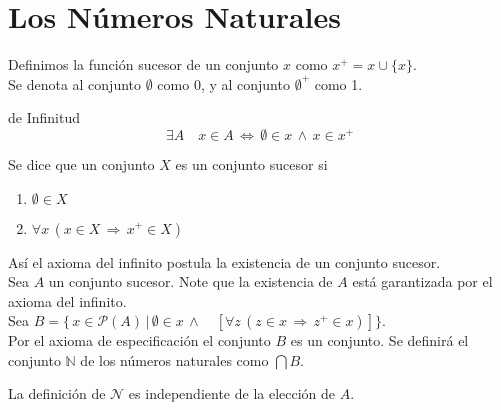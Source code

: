     \section{Los Números Naturales}
    \begin{definition}
        Definimos la función sucesor de un conjunto $x$ como $x^+ = x \cup
        \{x\}$.
        \\
        Se denota al conjunto $\emptyset$ como 0, y al conjunto $\emptyset^+$ como 1.
    \end{definition}
    \begin{axiom}{de Infinitud}
        \[
            \exists A \quad x \in A \, \Leftrightarrow \, \emptyset \in x \, \land
            \, x \in x^+
        \]
    \end{axiom}
        \begin{definition}
            Se dice que un conjunto $X$ es un conjunto sucesor si
            \begin{enumerate}
                \item $\emptyset \in X$
                \item $ \forall x \, (x \in X \, \Rightarrow \, x^{+} \in X)$
            \end{enumerate}
    \end{definition}
    Así el axioma del infinito postula la existencia de un conjunto sucesor. \\
    Sea $A$ un conjunto sucesor.
    Note que la existencia de $A$ está garantizada por el axioma del infinito.
    \\
    Sea $ B = \{ \, x \in \mathcal{P}(A) \, | \, \emptyset \in x \, \land \quad
    [\forall z \, (z \in x \, \Rightarrow \, z^+ \in x)]\}$. \\
    Por el axioma de especificación el conjunto $B$ es un conjunto. Se definirá
    el conjunto $\mathbb{N}$ de los números naturales como $\bigcap B$.
    \begin{proposition}
        La definición de $\mathcal{N}$ es independiente de la elección de $A$.
    \end{proposition}
